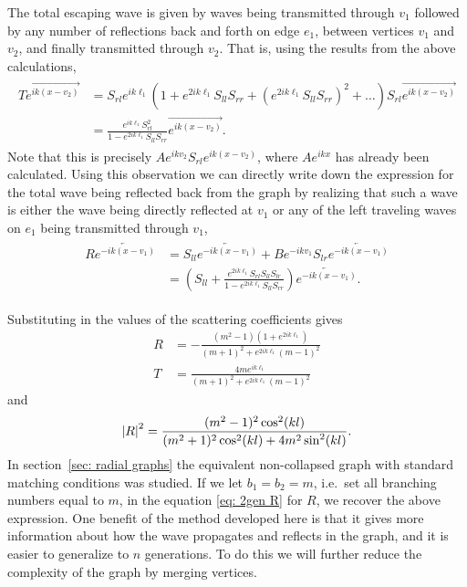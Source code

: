 The total escaping wave is given by waves being transmitted through $v_1$ followed by any number of reflections back and forth on edge $e_1$, between vertices $v_1$ and $v_2$, and finally transmitted through $v_2$. That is, using the results from the above calculations,
\begin{gather}\label{eq: transmission 2 generation snowflake}
  \begin{aligned}
    T \overrightarrow{e^{ik(x-v_2)}} &= S_{rl} e^{ik\ell_1} \left( 1 + e^{2ik\ell_1} S_{ll} S_{rr} + \left(e^{2ik\ell_1} S_{ll} S_{rr}\right)^2 + \ldots \right) S_{rl} \overrightarrow{e^{ik(x-v_2)}} \\
    &= \frac{e^{ik\ell_1} S_{rl}^2}{1 - e^{2ik\ell_1} S_{ll} S_{rr}} \overrightarrow{e^{ik(x-v_2)}}.
  \end{aligned}
\end{gather}
Note that this is precisely $A e^{ikv_2} S_{rl} e^{ik(x-v_2)}$, where $A e^{ikx}$ has already been calculated. Using this observation we can directly write down the expression for the total wave being reflected back from the graph by realizing that such a wave is either the wave being directly reflected at $v_1$ or any of the left traveling waves on $e_1$ being transmitted through $v_1$,
\begin{gather}\label{eq: reflection 2 generation snowflake}
  \begin{aligned}
    R \overleftarrow{e^{-ik(x-v_1)}} &= S_{ll} \overleftarrow{e^{-ik(x-v_1)}} + B e^{-ikv_1} S_{lr} \overleftarrow{e^{-ik(x-v_1)}} \\
    &= \left( S_{ll} + \frac{e^{2ik\ell_1} S_{rl} S_{ll} S_{lr}}{1 - e^{2ik\ell_1} S_{ll} S_{rr}} \right) \overleftarrow{e^{-ik(x-v_1)}}.
  \end{aligned}
\end{gather}

Substituting in the values of the scattering coefficients gives
\begin{equation}\label{eq: scattering coefficients 2 generation snowflake}
  \begin{aligned}
    R  &= -\frac{(m^2-1)(1 + e^{2ik\ell_1})}{(m+1)^2 + e^{2ik\ell_1} (m-1)^2} \\
    T &=  \frac{4m e^{ik\ell_1}}{(m+1)^2+e^{2ik\ell_1}(m-1)^2}
  \end{aligned}
\end{equation}
and
\[
  \left\lvert R\right\rvert^2 = \frac{(m^2-1)^2 \cos^2(kl)}{(m^2+1)^2 \cos^2(kl) + 4m^2\sin^2(kl)}.
\]
In section~\ref{sec: radial graphs} the equivalent non-collapsed graph with standard matching conditions was studied. If we let $b_1 = b_2 = m$, i.e.\ set all branching numbers equal to $m$, in the equation \eqref{eq: 2gen R} for $R$, we recover the above expression. One benefit of the method developed here is that it gives more information about how the wave propagates and reflects in the graph, and it is easier to generalize to $n$ generations. To do this we will further reduce the complexity of the graph by merging vertices.



